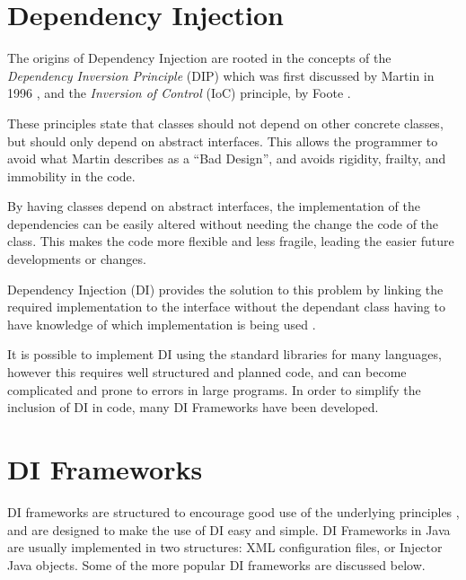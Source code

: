 \documentclass[12pt,twocolumn]{IEEEtran}
\begin{document}
\section{Dependency Injection}\label{sec:di}

The origins of Dependency Injection are rooted in the concepts of the \textit{Dependency Inversion Principle} (DIP) which was first discussed by Martin in 1996 \cite{martin1996}, and the \textit{Inversion of Control} (IoC) principle, by Foote \cite{foote1988}. 



These principles state that classes should not depend on other concrete classes, but should only depend on abstract interfaces. This allows the programmer to avoid what Martin describes as a ``Bad Design'', and avoids rigidity, frailty, and immobility in the code.

By having classes depend on abstract interfaces, the implementation of the dependencies can be easily altered without needing the change the code of the class. This makes the code more flexible and less fragile, leading the easier future developments or changes. 

Dependency Injection (DI) provides the solution to this problem by linking the required implementation to the interface without the dependant class having to have knowledge of which implementation is being used \cite{tonymarston2016,hongyulyangewantemperohaydenmelton2008}. 

It is possible to implement DI using the standard libraries for many languages, however this requires well structured and planned code, and can become complicated and prone to errors in large programs. In order to simplify the inclusion of DI in code, many DI Frameworks have been developed.

\section{DI Frameworks}\label{sec:dif}

DI frameworks are structured to encourage good use of the underlying principles \cite{rodjohnson2005,dennisdoomen2018}, and are designed to make the use of DI easy and simple. DI Frameworks in Java are usually implemented in two structures: XML configuration files, or Injector Java objects. Some of the more popular DI frameworks are discussed below.
\end{document}

